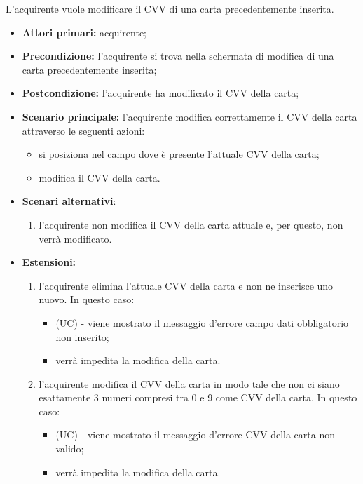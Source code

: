 L'acquirente vuole modificare il CVV di una carta precedentemente inserita.
\begin{itemize}
    \item \textbf{Attori primari:} acquirente;
    \item \textbf{Precondizione:} l'acquirente si trova nella schermata di modifica di una carta precedentemente inserita;
    \item \textbf{Postcondizione:} l'acquirente ha modificato il CVV della carta;
    \item \textbf{Scenario principale:} l'acquirente modifica correttamente il CVV della carta attraverso le seguenti azioni:
    \begin{itemize}
        \item si posiziona nel campo dove è presente l'attuale CVV della carta;
        \item modifica il CVV della carta.
    \end{itemize}
    \item \textbf{Scenari alternativi}:
    \begin{enumerate}[label=\lett]
        \item l'acquirente non modifica il CVV della carta attuale e, per questo, non verrà modificato.
    \end{enumerate}
    \item \textbf{Estensioni:}
    \begin{enumerate}[label=\lett]
        \item l'acquirente elimina l'attuale CVV della carta e non ne inserisce uno nuovo. In questo caso:
        \begin{itemize}
            \item (UC) - viene mostrato il messaggio d'errore campo dati obbligatorio non inserito;
            \item verrà impedita la modifica della carta.
        \end{itemize}
        \item l'acquirente modifica il CVV della carta in modo tale che non ci siano esattamente 3 numeri compresi tra 0 e 9 come CVV della carta. In questo caso:
        \begin{itemize}
            \item (UC) - viene mostrato il messaggio d'errore CVV della carta non valido;
            \item verrà impedita la modifica della carta.
        \end{itemize}
    \end{enumerate}
\end{itemize}

